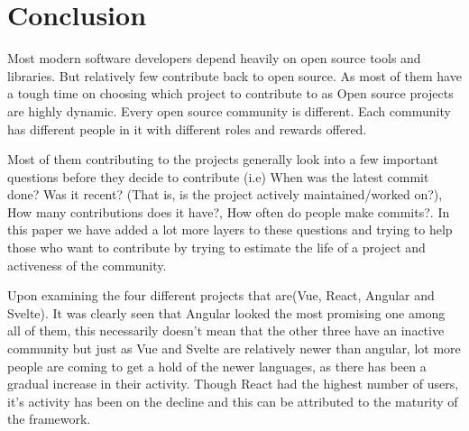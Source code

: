 \section{Conclusion}
Most modern software developers depend heavily on open source tools and libraries. But relatively few contribute back to open source.
As most of them have a tough time on choosing which project to contribute to as Open source projects are highly dynamic. 
Every open source community is different. Each community has different people in it with different roles and rewards offered. 

Most of them contributing  to the projects generally look into a few important questions before they decide to contribute (i.e) When was the latest commit done? Was it recent? (That is, is the project actively maintained/worked on?), How many contributions does it have?, How often do people make commits?. 
In this paper we have added a lot more layers to these questions and trying to help those who want to contribute by trying to estimate the life of a project and activeness of the community.

Upon examining the four different projects that are(Vue, React, Angular and Svelte). It was clearly seen that Angular looked the most promising one among all of them, this necessarily doesn’t mean that the other three have an inactive community but just as Vue and Svelte are relatively newer than angular, lot more people are coming to get a hold of the newer languages, as there has been a gradual increase in their activity. 
Though React had the highest number of users, it’s activity has been on the decline and this can be attributed to the maturity of the framework.
